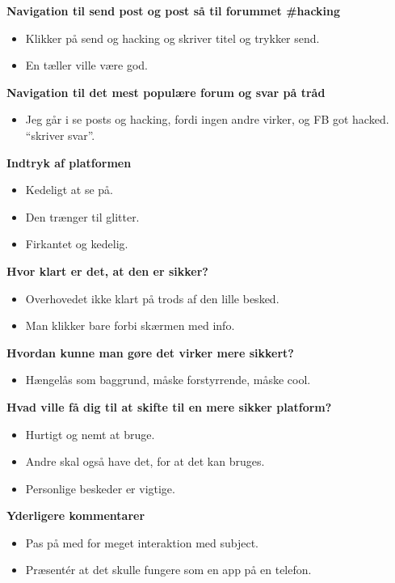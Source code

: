 \noindent\textbf{Navigation til send post og post så til forummet \#hacking}
\begin{itemize}
    \item Klikker på send og hacking og skriver titel og trykker send.
    \item En tæller ville være god.
\end{itemize}

\noindent\textbf{Navigation til det mest populære forum og svar på tråd}
\begin{itemize}
    \item Jeg går i se posts og hacking, fordi ingen andre virker, og FB got hacked. “skriver svar”.
\end{itemize}

\noindent\textbf{Indtryk af platformen}
\begin{itemize}
    \item Kedeligt at se på.
    \item Den trænger til glitter.
    \item Firkantet og kedelig.
\end{itemize}

\noindent\textbf{Hvor klart er det, at den er sikker?}
\begin{itemize}
    \item Overhovedet ikke klart på trods af den lille besked.
    \item Man klikker bare forbi skærmen med info.
\end{itemize}

\noindent\textbf{Hvordan kunne man gøre det virker mere sikkert?}
\begin{itemize}
    \item Hængelås som baggrund, måske forstyrrende, måske cool.
\end{itemize}

\noindent\textbf{Hvad ville få dig til at skifte til en mere sikker platform?}
\begin{itemize}
    \item Hurtigt og nemt at bruge.
    \item Andre skal også have det, for at det kan bruges.
    \item Personlige beskeder er vigtige.
\end{itemize}

\noindent\textbf{Yderligere kommentarer}
\begin{itemize}
    \item Pas på med for meget interaktion med subject.
    \item Præsentér at det skulle fungere som en app på en telefon.
\end{itemize}

